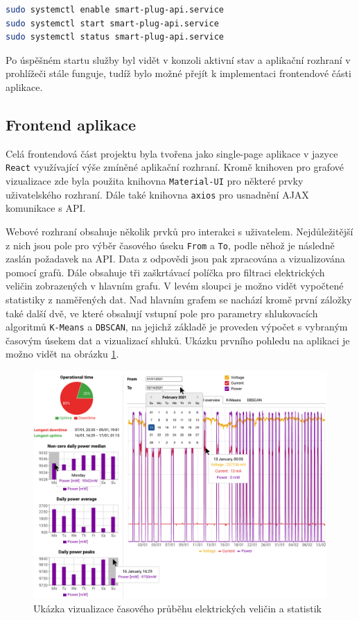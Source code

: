 \documentclass[czech,master,dept460,male,cpp,cpdeclaration,oneside]{diploma}
\begin{document}
\begin{lstlisting}[language=bash,caption=Povolení a start služby]
sudo systemctl enable smart-plug-api.service
sudo systemctl start smart-plug-api.service
sudo systemctl status smart-plug-api.service
\end{lstlisting}

\noindent Po úspěšném startu služby byl vidět v konzoli aktivní stav a aplikační rozhraní v prohlížeči stále funguje, tudíž bylo možné přejít k implementaci frontendové části aplikace.

\pagebreak
\subsection{Frontend aplikace} 
Celá frontendová část projektu byla tvořena jako single-page aplikace v jazyce \texttt{React} využívající výše zmíněné aplikační rozhraní. Kromě knihoven pro grafové vizualizace zde byla použita knihovna \texttt{Material-UI}\autocite{MaterialUI} pro některé prvky uživatelského rozhraní. Dále také knihovna \texttt{axios}\autocite{axios} pro usnadnění AJAX komunikace s API.

Webové rozhraní obsahuje několik prvků pro interakci s uživatelem. Nejdůležitější z nich jsou pole pro výběr časového úseku \texttt{From} a \texttt{To}, podle něhož je následně zaslán požadavek na API. Data z odpovědi jsou pak zpracována a vizualizována pomocí grafů. Dále obsahuje tři zaškrtávací políčka pro filtraci elektrických veličin zobrazených v hlavním grafu. V levém sloupci je možno vidět vypočtené statistiky z naměřených dat. Nad hlavním grafem se nachází kromě první záložky také další dvě, ve které obsahují vstupní pole pro parametry shlukovacích algoritmů \texttt{K-Means} a \texttt{DBSCAN}, na jejichž základě je proveden výpočet s vybraným časovým úsekem dat a vizualizací shluků. Ukázku prvního pohledu na aplikaci je možno vidět na obrázku \ref{fig:React1}.

\bigbreak
\begin{figure}[h!]
	\centering
	\includegraphics[width=1\textwidth]{Figures/React1-1.png}
	\caption{Ukázka vizualizace časového průběhu elektrických veličin a statistik}
	\label{fig:React1}
\end{figure}
\pagebreak
\end{document}

